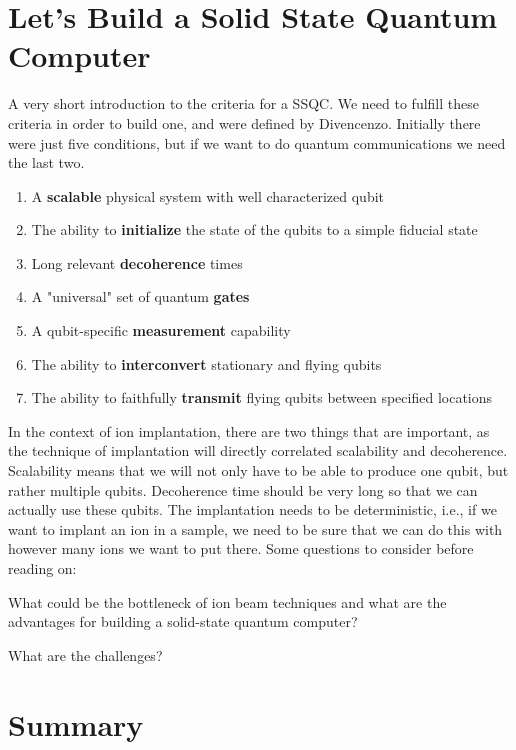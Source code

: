 \section{Let's Build a Solid State Quantum Computer}\label{sec:let's-build-a-solid-state-quantum-computer}
A very short introduction to the criteria for a SSQC. We need to fulfill these criteria in order to build one, and were defined by Divencenzo.
Initially there were just five conditions, but if we want to do quantum communications we need the last two.
\begin{enumerate}
	\item A \textbf{scalable} physical system with well characterized qubit
	\item The ability to \textbf{initialize} the state of the qubits to a simple fiducial state
	\item Long relevant \textbf{decoherence} times
	\item A "universal" set of quantum \textbf{gates}
	\item A qubit-specific \textbf{measurement} capability
	\item The ability to \textbf{interconvert} stationary and flying qubits
	\item The ability to faithfully \textbf{transmit} flying qubits between specified locations
\end{enumerate}
In the context of ion implantation, there are two things that are important, as the technique of implantation will directly correlated scalability and decoherence.
Scalability means that we will not only have to be able to produce one qubit, but rather multiple qubits.
Decoherence time should be very long so that we can actually use these qubits.
The implantation needs to be deterministic, i.e., if we want to implant an ion in a sample, we need to be sure that we can do this with however many ions we want to put there.
Some questions to consider before reading on:
\begin{myitemize}
	\item What could be the bottleneck of ion beam techniques and what are the advantages for building a solid-state quantum computer?
	\item What are the challenges?
\end{myitemize}


\section{Summary}\label{sec:summary5}

